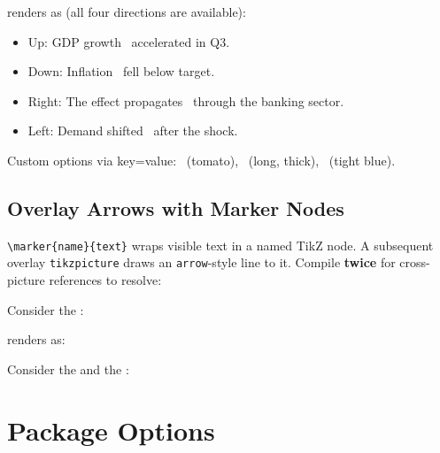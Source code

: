 \documentclass[11pt,a4paper]{article}
\begin{document}
\noindent renders as (all four directions are available):

\begin{itemize}
    \item Up:    GDP growth \jarrowup\ accelerated in Q3.
    \item Down:  Inflation \jarrowdown\ fell below target.
    \item Right: The effect propagates \jarrowright\ through the banking sector.
    \item Left:  Demand shifted \jarrowleft\ after the shock.
\end{itemize}

Custom options via key=value: \jarrowup[color=tomato]\ (tomato), \jarrowr[len=0.6cm,lw=0.1cm]\ (long, thick), \jarrowd[color=note,pad=0.1em]\ (tight blue).

\subsection{Overlay Arrows with Marker Nodes}

\verb|\marker{name}{text}| wraps visible text in a named TikZ node. A subsequent overlay \texttt{tikzpicture} draws an \texttt{arrow}-style line to it. Compile \textbf{twice} for cross-picture references to resolve:

\begin{democode}
Consider the :
\end{democode}

\noindent renders as:

Consider the  and the :
\vspace{1.5cm}

\section{Package Options}
\end{document}
